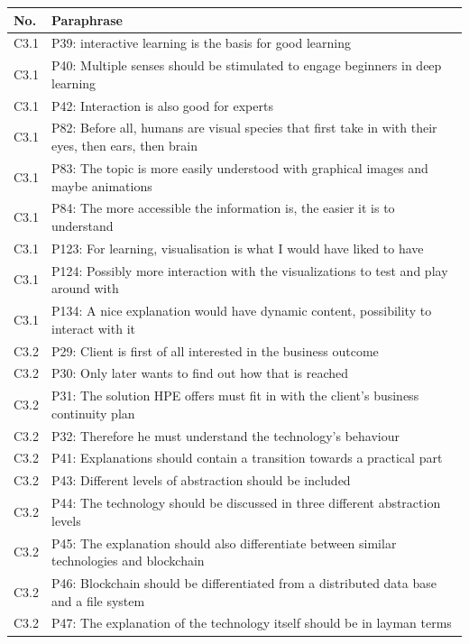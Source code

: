 \begin{table}[H]
    \centering
    \begin{tabularx}{\textwidth}{l|X}
    No. & Paraphrase \\\hline
    C3.1 & P39: interactive learning is the basis for good learning \\  
	C3.1 & P40: Multiple senses should be stimulated to engage beginners in deep learning \\  
	C3.1 & P42: Interaction is also good for experts \\  
	C3.1 & P82: Before all, humans are visual species that first take in with their eyes, then ears, then brain \\  
	C3.1 & P83: The topic is more easily understood with graphical images and maybe animations \\  
	C3.1 & P84: The more accessible the information is, the easier it is to understand \\  
	C3.1 & P123: For learning, visualisation is what I would have liked to have \\  
	C3.1 & P124: Possibly more interaction with the visualizations to test and play around with \\  
	C3.1 & P134: A nice explanation would have dynamic content, possibility to interact with it \\\hline
	C3.2 & P29: Client is first of all interested in the business outcome \\  
	C3.2 & P30: Only later wants to find out how that is reached \\  
	C3.2 & P31: The solution HPE offers must fit in with the client's business continuity plan \\  
	C3.2 & P32: Therefore he must understand the technology's behaviour \\  
	C3.2 & P41: Explanations should contain a transition towards a practical part \\  
	C3.2 & P43: Different levels of abstraction should be included \\  
	C3.2 & P44: The technology should be discussed in three different abstraction levels \\  
	C3.2 & P45: The explanation should also differentiate between similar technologies and blockchain \\  
	C3.2 & P46: Blockchain should be differentiated from a distributed data base and a file system \\  
	C3.2 & P47: The explanation of the technology itself should be in layman terms \\  

\end{tabularx}
\end{table}
